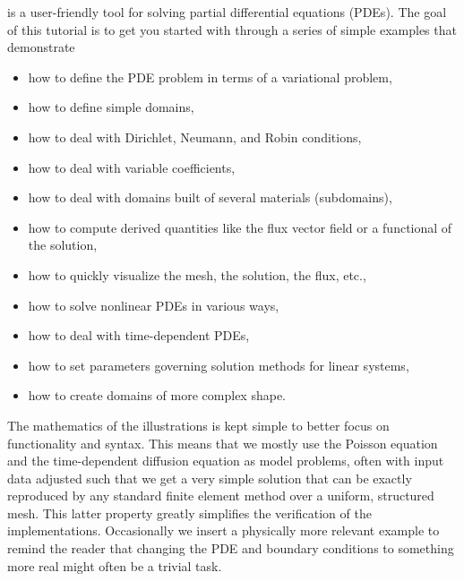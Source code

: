 \fenics{} is a user-friendly tool for solving partial differential
equations (PDEs). The goal of this tutorial is to get you started with
\fenics{} through a series of simple examples that demonstrate
\begin{itemize}
  \item how to define the PDE problem in terms of a variational problem,

  \item how to define simple domains,

  \item how to deal with Dirichlet, Neumann, and Robin conditions,

  \item how to deal with variable coefficients,

  \item how to deal with domains built of several materials (subdomains),

  \item how to compute derived quantities like the flux vector field or
  a functional of the solution,

  \item how to quickly visualize the mesh, the solution, the flux, etc.,

  \item how to solve nonlinear PDEs in various ways,

  \item how to deal with time-dependent PDEs,

  \item how to set parameters governing solution methods for linear
  systems,

  \item how to create domains of more complex shape.
\end{itemize}
The mathematics of the illustrations is kept simple to better focus
on \fenics{} functionality and syntax. This means that we mostly use
the Poisson equation and the time-dependent diffusion equation as model
problems, often with input data adjusted such that we get a very simple
solution that can be exactly reproduced by any standard finite element
method over a uniform, structured mesh. This latter property greatly
simplifies the verification of the implementations.  Occasionally we
insert a physically more relevant example to remind the reader that
changing the PDE and boundary conditions to something more real might
often be a trivial task.


